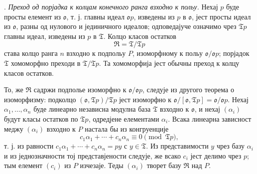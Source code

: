 \documentclass[11pt]{article}
\newcommand{\mo}{\mathfrak{o}}
\newcommand{\mT}{\mathfrak{T}}
\newcommand{\mR}{\mathfrak{R}}
\begin{document}
\setcounter{footnote}{28}

. \emph{Преход од порјадка к колцам конечного ранга взходно к польу.}
Нехај $p$ буде просты елемент из $\mo$, т. ј. главны идеал $\mo p$, изведены из $p$ в $\mo$, јест просты идеал из $\mo$, разны од нулового и јединичного идеалов; одповедајуче означимо чрез $\mT p$ главны идеал, изведены из $p$ в $\mT$. Колцо класов остатков
\[
        \mR=\mT/\mT p
\]
става колцо ранга $n$ взходно к подпольу $P$, изоморфному к польу $\mo/\mo p$; порјадок $\mT$ хомоморфно преходи в $\mT/\mT p$. Та хомоморфија јест обычны преход к колцу класов остатков.

То, же $\mR$ садржи подполье изоморфно к $\mo/\mo p$, следује из другого теорема о изоморфизму: подколцо $(\mo,\mT p)/\mT p$ јест изоморфно к $\mo/[\mo,\mT p]=\mo/\mo p$. Нехај $\alpha_1,\ldots,\alpha_n$ буде линеарно независна модулна база $\mT$ взходно к $\mo$, и нехај $(\alpha_i)$ будут класы остатков по $\mT p$, одредјене елементами $\alpha_i$. Всака линеарна зависност меджу $(\alpha_i)$ взходно к $P$ настала бы из конгруенције
\[
        c_1\alpha_1+\cdots+c_n\alpha_n\equiv0\pmod{\mT p},
\]
т. ј. из равности $c_1\alpha_1+\cdots+c_n\alpha_n=py$ с $y\in\mT$. Из представимости $y$ чрез базу $\alpha_i$ и из једнозначности тој представјености следује, же всако $c_i$ јест делимо чрез $p$; тым елемент $(c_i)$ из $P$ изчезаје. Теды $(\alpha_i)$ творет базу $\mR$ над $P$.
\end{document}
